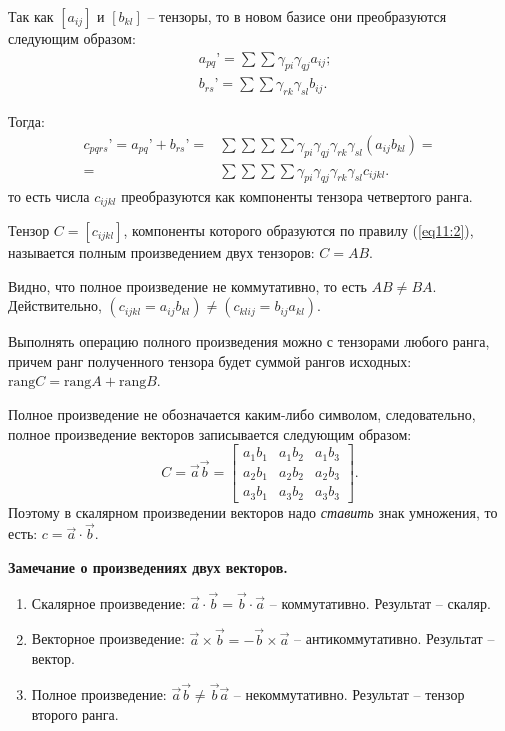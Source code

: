 	Так как \( [a_{ij}] \) и \( [b_{kl}] \) -- тензоры, то в новом базисе они преобразуются следующим образом:
	\begin{align}
	& a_{pq}{’} = \sum\sum \gamma_{pi}\gamma_{qj}a_{ij}; \nonumber \\
	& b_{rs}{’} = \sum\sum \gamma_{rk}\gamma_{sl}b_{ij}. \nonumber
	\end{align}
	
	Тогда:
	\begin{align}
	c_{pqrs}{’} = a_{pq}{’} + b_{rs}{’} = & \sum\sum\sum\sum \gamma_{pi}\gamma_{qj}\gamma_{rk}\gamma_{sl}(a_{ij}b_{kl}) = \nonumber \\
	= & \sum\sum\sum\sum \gamma_{pi}\gamma_{qj}\gamma_{rk}\gamma_{sl}c_{ijkl}. \nonumber
	\end{align}
	то есть числа \( c_{ijkl} \) преобразуются как компоненты тензора четвертого ранга.
	
	\begin{definition}
	Тензор \( C = [c_{ijkl}] \), компоненты которого образуются по правилу (\ref{eq11:2}), называется полным произведением двух тензоров: \( C = AB \).
	\end{definition}
	
	Видно, что полное произведение не коммутативно, то есть \( AB \ne BA \). Действительно, \( (c_{ijkl} = a_{ij}b_{kl}) \ne (c_{klij} = b_{ij}a_{kl}) \).
	
	Выполнять операцию полного произведения можно с тензорами любого ранга, причем ранг полученного тензора будет суммой рангов исходных: \( \mathrm{rang}C = \mathrm{rang}A + \mathrm{rang}B \).
	
	Полное произведение не обозначается каким-либо символом, следовательно, полное произведение векторов записывается следующим образом:
	\[ C = \vec{a}\vec{b} = \begin{bmatrix}
	a_1b_1 & a_1b_2 & a_1b_3 \\
	a_2b_1 & a_2b_2 & a_2b_3 \\
	a_3b_1 & a_3b_2 & a_3b_3
	\end{bmatrix}. \]
	Поэтому в скалярном произведении векторов надо \textit{ставить} знак умножения, то есть: \( c = \vec{a}\cdot\vec{b} \).
	
	\textbf{Замечание о произведениях двух векторов.}
	\begin{enumerate}
	\item Скалярное произведение: \( \vec{a}\cdot\vec{b} = \vec{b}\cdot\vec{a} \) -- коммутативно. Результат -- скаляр.
	\item Векторное произведение: \( \vec{a}\times\vec{b} = -\vec{b}\times\vec{a} \) -- антикоммутативно. Результат -- вектор.
	\item Полное произведение: \( \vec{a}\vec{b} \ne \vec{b}\vec{a} \) -- некоммутативно. Результат -- тензор второго ранга.
	\end{enumerate}

